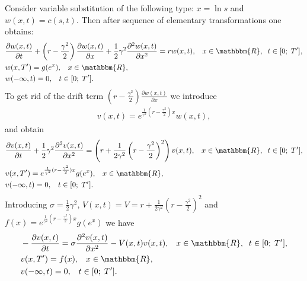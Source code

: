 \documentclass[11pt,a4paper]{extarticle}
\begin{document}
Consider variable substitution of the following type: $x=\ln s$ and $w(x,t) = c(s, t)$. Then after sequence of elementary transformations one obtains:
\begin{equation}
	\begin{aligned}
		&\frac{\partial w(x,t)}{\partial t} + \left(r-\frac{\gamma^2}{2}\right) \frac{\partial w(x,t)}{\partial x} + 
		\frac12 \gamma^2 \frac{\partial^2 w(x,t)}{\partial x^2} = rw(x,t),
		\;\;\;x \in \mathbbm{R},\;\; t \in [0;\;T^{\prime}],\\
		&w(x,T^{\prime}) = g(e^x), \;\;\; x \in \mathbbm{R},\\
		&w(-\infty,t) = 0, \;\;\; t \in [0;\;T^{\prime}].
	\end{aligned}
\end{equation}
To get rid of the drift term $\left(r-\frac{\gamma^2}{2}\right) \frac{\partial w(x,t)}{\partial x}$ we introduce
\begin{equation}
	\begin{aligned}
		v(x,t) = e^{\frac{1}{\gamma^2} (r-\frac{\gamma^2}{2})x} w(x,t),
	\end{aligned}
\end{equation}
and obtain
\begin{equation}
	\begin{aligned}
		&\frac{\partial v(x,t)}{\partial t} + \frac12 \gamma^2 \frac{\partial^2 v(x,t)}{\partial x^2} = 
		\left( r +  \frac{1}{2\gamma^2} \left( r-\frac{\gamma^2}{2}\right)^2 \right) v(x,t),
	 	\;\;\;x \in \mathbbm{R},\;\; t \in [0;\;T^{\prime}],\\
		&v(x,T^{\prime}) = e^{\frac{1}{\gamma^2} (r-\frac{\gamma^2}{2})x} g(e^x), \;\;\; x \in \mathbbm{R},\\
		&v(-\infty,t) = 0, \;\;\; t \in [0;\;T^{\prime}].
	\end{aligned}
\end{equation}
Introducing 
$\sigma = \frac12 \gamma^2$, $V(x,t) = V = r +  \frac{1}{2\gamma^2} \left( r-\frac{\gamma^2}{2}\right)^2$ and
$f(x) = e^{\frac{1}{\gamma^2} (r-\frac{\gamma^2}{2})x} g(e^x)$  we have
\begin{equation}
	\begin{aligned}
		&-\frac{\partial v(x,t)}{\partial t} = \sigma \frac{\partial^2 v(x,t)}{\partial x^2} - V(x,t) v(x,t),
		\;\;\;x \in \mathbbm{R},\;\; t \in [0;\;T^{\prime}],\\
		&v(x,T^{\prime}) = f(x), \;\;\; x \in \mathbbm{R},\\
		&v(-\infty,t) = 0, \;\;\; t \in [0;\;T^{\prime}].
	\end{aligned}
\end{equation}
\end{document}
